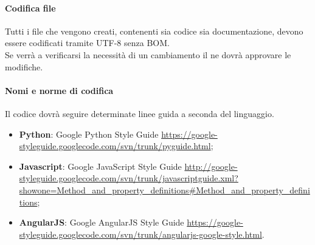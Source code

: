 			\paragraph{Codifica file} %
			\label{par:codifica}
			Tutti i file che vengono creati, contenenti sia codice sia documentazione, devono essere codificati tramite UTF-8 senza BOM. \\
			Se verrà a verificarsi la necessità di un cambiamento il \roleProjectManager{} ne dovrà approvare le modifiche.

			\paragraph{Nomi e norme di codifica} %
			\label{par:nomi_e_norme_di_codifica}
			Il codice dovrà seguire determinate linee guida a seconda del linguaggio.
				\begin{itemize}
					\item \textbf{Python}: Google Python Style Guide \url{https://google-styleguide.googlecode.com/svn/trunk/pyguide.html};
					\item \textbf{Javascript}: Google JavaScript Style Guide \url{http://google-styleguide.googlecode.com/svn/trunk/javascriptguide.xml?showone=Method_and_property_definitions#Method_and_property_definitions};
					\item \textbf{AngularJS}: Google AngularJS Style Guide \url{https://google-styleguide.googlecode.com/svn/trunk/angularjs-google-style.html}.
				\end{itemize}

